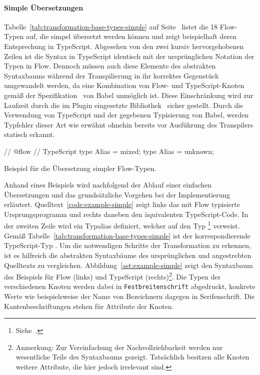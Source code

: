 \paragraph{Simple Übersetzungen}

Tabelle~\ref{tab:transformation-base-types-simple} auf Seite~\pageref{tab:transformation-base-types-simple} listet die 18 Flow-Typen auf, die simpel übersetzt werden können und zeigt beispielhaft deren Entsprechung in TypeScript. Abgesehen von den zwei kursiv hervorgehobenen Zeilen ist die Syntax in TypeScript identisch mit der ursprünglichen Notation der Typen in Flow. Dennoch müssen auch diese Elemente des abstrakten Syntaxbaums während der Transpilierung in ihr korrektes Gegenstück umgewandelt werden, da eine Kombination von Flow- und TypeScript-Knoten gemäß der Spezifikation~\autocite{BABEL:PARSER_SPEC} von Babel unmöglich ist. Diese Einschränkung wird zur Laufzeit durch die im Plugin eingesetzte Bibliothek \,\autocite{BABEL:TYPES} sicher gestellt. Durch die Verwendung von TypeScript und der gegebenen Typisierung von Babel, werden Typfehler dieser Art wie erwähnt ohnehin bereits vor Ausführung des Transpilers statisch erkannt.

\bigbreak


\bigbreak
\begin{listing}[htb]
\begin{textcode}
// @flow                              // TypeScript
type Alias = mixed;                  type Alias = unknown;
\end{textcode}
\listingvspace
\caption{Beispiel für die Übersetzung simpler Flow-Typen.}
\label{code:example-simple}
\end{listing}

Anhand eines Beispiels wird nachfolgend der Ablauf einer einfachen Übersetzungen und das grundsätzliche Vorgehen bei der Implementierung erläutert. Quelltext~\ref{code:example-simple} zeigt links das mit Flow typisierte Ursprungsprogramm und rechts daneben den äquivalenten TypeScript-Code. In der zweiten Zeile wird ein Typalias definiert, welcher auf den Typ
\footnote{Siehe~\autocite[Mixed Types]{FLOW:TYPE_ANNOTATIONS}.} verweist. Gemäß Tabelle~\ref{tab:transformation-base-types-simple} ist der korrespondierende TypeScript-Typ . Um die notwendigen Schritte der Transformation zu erkennen, ist es hilfreich die abstrakten Syntaxbäume des ursprünglichen und angestrebten Quelltexts zu vergleichen. Abbildung~\ref{ast:example-simple} zeigt den Syntaxbaum des Beispiels für Flow (links) und TypeScript (rechts)\footnote{Anmerkung: Zur Vereinfachung der Nachvollziehbarkeit werden nur wesentliche Teile des Syntaxbaums gezeigt. Tatsächlich besitzen alle Knoten weitere Attribute, die hier jedoch irrelevant sind.}. Die Typen der verschiedenen Knoten werden dabei in \texttt{Festbreitenschrift} abgedruckt, konkrete Werte wie beispielsweise der Name von Bezeichnern dagegen in Serifenschrift. Die Kantenbeschriftungen stehen für Attribute der Knoten.

